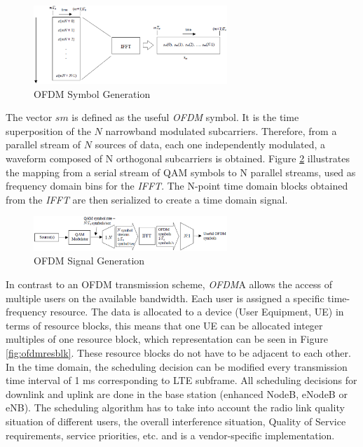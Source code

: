 \begin{figure}[htbp]
    \centering
    \includegraphics[width=0.65\textwidth]{./figures/ofdm_symbol_gen}
    \caption{ OFDM Symbol Generation \cite{umtslte}
    \label{fig:ofdmsymbol}}
\end{figure}

The vector $sm$ is defined as the useful \textit{OFDM} symbol. It is the time
superposition of the $N$ narrowband modulated subcarriers. Therefore, from a
parallel stream of $N$ sources of data, each one independently modulated, a
waveform composed of N orthogonal subcarriers is obtained. Figure
\ref{fig:ofdmchain} illustrates the mapping from a serial stream of QAM symbols
to N parallel streams, used as frequency domain bins for the \textit{IFFT}. The
N-point time domain blocks obtained from the \textit{IFFT} are then serialized
to create a time domain signal.

\begin{figure}[htbp]
    \centering
    \includegraphics[width=0.65\textwidth]{./figures/ofdm_signal_chain}
    \caption{ OFDM Signal Generation \cite{umtslte}
    \label{fig:ofdmchain}}
\end{figure}

In contrast to an OFDM transmission scheme, \textit{OFDM}A allows the access of
multiple users on the available bandwidth. Each user is assigned a specific
time-frequency resource. The data is allocated to a device (User Equipment, UE)
in terms of resource blocks, this means that one UE can be allocated integer
multiples of one resource block, which representation can be seen in Figure
\ref{fig:ofdmresblk}. These resource blocks do not have to be adjacent to each
other. In the time domain, the scheduling decision can be modified every
transmission time interval of 1 ms corresponding to LTE subframe. All scheduling
decisions for downlink and uplink are done in the base station (enhanced NodeB,
eNodeB or eNB). The scheduling algorithm has to take into account the radio link
quality situation of different users, the overall interference situation,
Quality of Service requirements, service priorities, etc. and is a
vendor-specific implementation.


